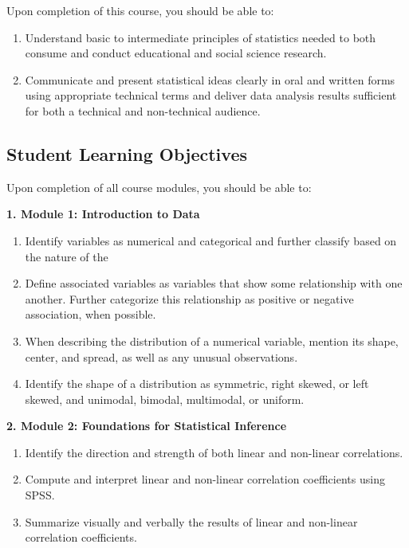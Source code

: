 \documentclass[
]{article}
\providecommand{\tightlist}{%
  \setlength{\itemsep}{0pt}\setlength{\parskip}{0pt}}
\begin{document}
Upon completion of this course, you should be able to:

\begin{enumerate}
\def\labelenumi{\arabic{enumi}.}
\tightlist
\item
  Understand basic to intermediate principles of statistics needed to
  both consume and conduct educational and social science research.
\item
  Communicate and present statistical ideas clearly in oral and written
  forms using appropriate technical terms and deliver data analysis
  results sufficient for both a technical and non-technical audience.
\end{enumerate}

\subsection{Student Learning Objectives}

Upon completion of all course modules, you should be able to:

\textbf{1. Module 1: Introduction to Data}

\begin{enumerate}
\def\labelenumi{\arabic{enumi}.}
\tightlist
\item
  Identify variables as numerical and categorical and further classify
  based on the nature of the
\item
  Define associated variables as variables that show some relationship
  with one another. Further categorize this relationship as positive or
  negative association, when possible.
\item
  When describing the distribution of a numerical variable, mention its
  shape, center, and spread, as well as any unusual observations.
\item
  Identify the shape of a distribution as symmetric, right skewed, or
  left skewed, and unimodal, bimodal, multimodal, or uniform.
\end{enumerate}

\textbf{2. Module 2: Foundations for Statistical Inference}

\begin{enumerate}
\def\labelenumi{\arabic{enumi}.}
\tightlist
\item
  Identify the direction and strength of both linear and non-linear
  correlations.
\item
  Compute and interpret linear and non-linear correlation coefficients
  using SPSS.
\item
  Summarize visually and verbally the results of linear and non-linear
  correlation coefficients.
\end{enumerate}
\end{document}
